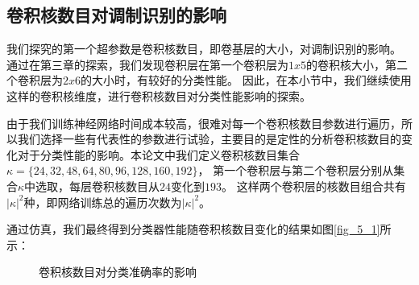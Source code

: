 %


\subsection{卷积核数目对调制识别的影响}
我们探究的第一个超参数是卷积核数目，即卷基层的大小，对调制识别的影响。
通过在第三章的探索，我们发现卷积层在第一个卷积层为$1x5$的卷积核大小，第二个卷积层为$2x6$的大小时，有较好的分类性能。
因此，在本小节中，我们继续使用这样的卷积核维度，进行卷积核数目对分类性能影响的探索。\par
由于我们训练神经网络时间成本较高，很难对每一个卷积核数目参数进行遍历，所以我们选择一些有代表性的参数进行试验，主要目的是定性的分析卷积核数目的变化对于分类性能的影响。本论文中我们定义卷积核数目集合$\kappa =\{24, 32, 48, 64, 80, 96, 128, 160, 192\}$，
第一个卷积层与第二个卷积层分别从集合$\kappa$中选取，每层卷积核数目从$24$变化到$193$。
这样两个卷积层的核数目组合共有$|\kappa|^2$种，即网络训练总的遍历次数为$|\kappa|^2$。\par
通过仿真，我们最终得到分类器性能随卷积核数目变化的结果如图\ref{fig_5_1}所示：\par
\begin{figure}[!h]
	\centering
	\caption{卷积核数目对分类准确率的影响}
	\label{fig_5_3}
\end{figure}


